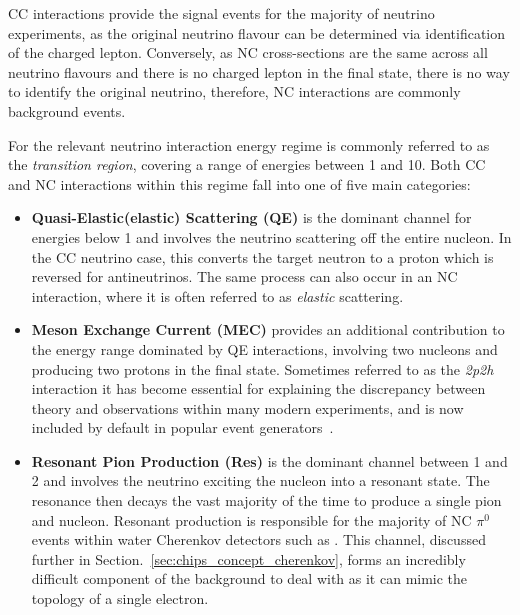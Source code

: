 CC interactions provide the signal events for the majority of neutrino experiments, as the
original neutrino flavour can be determined via identification of the charged lepton. Conversely,
as NC cross-sections are the same across all neutrino flavours and there is no charged lepton in
the final state, there is no way to identify the original neutrino, therefore, NC interactions are
commonly background events.

For \chips the relevant neutrino interaction energy regime is commonly referred to as the
\emph{transition region}, covering a range of energies between 1 and \unit{10}{\GeV}. Both CC and
NC interactions within this regime fall into one of five main categories:

\begin{itemize}
    \item \textbf{Quasi-Elastic(elastic) Scattering (QE)} is the dominant channel for energies
          below \unit{1}{\GeV} and involves the neutrino scattering off the entire nucleon. In the
          CC neutrino case, this converts the target neutron to a proton which is reversed for
          antineutrinos. The same process can also occur in an NC interaction, where it is often
          referred to as \emph{elastic} scattering.

    \item \textbf{Meson Exchange Current (MEC)} provides an additional contribution to the energy
          range dominated by QE interactions, involving two nucleons and producing two protons in
          the final state. Sometimes referred to as the \emph{2p2h} interaction it has become
          essential for explaining the discrepancy between theory and observations within many
          modern experiments, and is now included by default in popular event
          generators~\cite{katori2013}.

    \item \textbf{Resonant Pion Production (Res)} is the dominant channel between 1 and
          \unit{2}{\GeV} and involves the neutrino exciting the nucleon into a resonant state. The
          resonance then decays the vast majority of the time to produce a single pion and
          nucleon. Resonant production is responsible for the majority of NC $\pi^{0}$ events
          within water Cherenkov detectors such as \chips. This channel, discussed further in
          Section.~\ref{sec:chips_concept_cherenkov}, forms an incredibly difficult component of
          the background to deal with as it can mimic the topology of a single electron.


\end{itemize}
